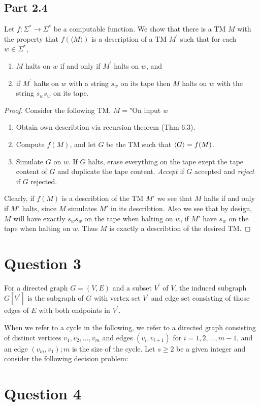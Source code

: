 \documentclass[a4paper,11pt]{article}
\numberwithin{equation}{section}
\begin{document}
	\subsection*{Part 2.4}
	Let $f: \Sigma^{*} \rightarrow \Sigma^{*}$ be a computable function. We show that there is a TM $M$ with the property that $f(\langle M\rangle)$ is a description of a TM $M^{\prime}$ such that for each $w \in \Sigma^{*}$,
	
	\begin{enumerate}
		\item $M$ halts on $w$ if and only if $M^{\prime}$ halts on $w$, and
		\item if $M^{\prime}$ halts on $w$ with a string $s_{w}$ on its tape then $M$ halts on $w$ with the string $s_{w} s_{w}$ on its tape.
	\end{enumerate}
\begin{proof}
	Consider the following TM, $ M= $"On input $ w $\begin{enumerate}
		\item Obtain own describtion via recursion theorem (Thm 6.3).
		\item Compute $ f(M) $, and let $ G $ be the TM such that $ \braket{G}=f(M) $.
		\item Simulate $ G $ on $ w $. If $ G $ halts, erase everything on the tape exept the tape content of $ G $ and duplicate the tape content. \emph{Accept} if $ G $ accepted and \emph{reject} if $ G $ rejected.
	\end{enumerate}
	Clearly, if $ f(M) $ is a describtion of the TM $ M' $ we see that $ M $ halts if and only if $ M' $ halts, since $ M $ simulates $ M' $ in its describtion. Also we see that by design, $ M $ will have exactly $ s_ws_w $ on the tape when halting on $ w $, if $ M' $ have $ s_w $ on the tape when halting on $ w $. Thus $ M $ is exactly a describtion of the desired TM.
\end{proof}
	\section*{Question 3}
	For a directed graph $G=(V, E)$ and a subset $V^{\prime}$ of $V$, the induced subgraph $G\left[V^{\prime}\right]$ is the subgraph of $G$ with vertex set $V^{\prime}$ and edge set consisting of those edges of $E$ with both endpoints in $V^{\prime}$.
	
	When we refer to a cycle in the following, we refer to a directed graph consisting of distinct vertices $v_{1}, v_{2}, \ldots, v_{m}$ and edges $\left(v_{i}, v_{i+1}\right)$ for $i=1,2, \ldots, m-1$, and an edge $\left(v_{m}, v_{1}\right) ; m$ is the size of the cycle. Let $s \geq 2$ be a given integer and consider the following decision problem:
	
	
	
	
	\section*{Question 4}
	
\end{document}
